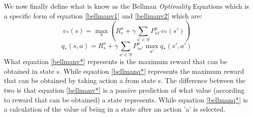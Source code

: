 We now finally define what is know as the Bellman \textit{Optimality} Equations which is a specific form of equation \ref{bellmanv1} and \ref{bellmanv2} which are:
\begin{equation}
	v_*(s) = \max\limits_{a}(R^{a}_s+\gamma\sum_{s'\in S}P^{a}_{ss'}v_*(s'))
	\label{bellmanv*}
\end{equation}
\begin{equation}
	q_*(s,a) = R^{a}_s +\gamma \sum_{s'\in S}P^{a}_{ss'}\max\limits_{a'}q_*(s',a')
	\label{bellmanq*}
\end{equation}
What equation \ref{bellmanv*} represents is the maximum reward that can be obtained in state s. While equation \ref{bellmanq*} represents the maximum reward that can be obtained by taking action a from state s. The difference between the two is that equation \ref{bellmanv*} is a passive prediction of what value (according to reward that can be obtained) a state represents. While equation \ref{bellmanq*} is a calculation of the value of being in a state after an action 'a' is selected.

